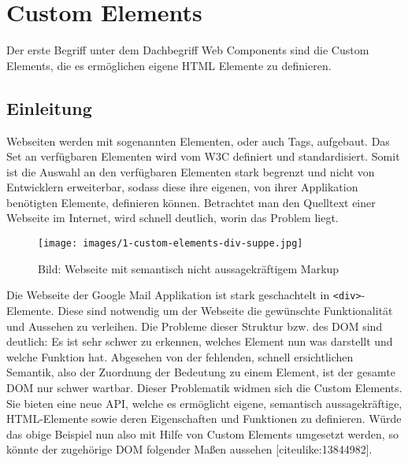 \section{Custom Elements}\label{custom-elements}

Der erste Begriff unter dem Dachbegriff Web Components sind die Custom
Elements, die es ermöglichen eigene HTML Elemente zu definieren.

\subsection{Einleitung}\label{einleitung}

Webseiten werden mit sogenannten Elementen, oder auch Tags, aufgebaut.
Das Set an verfügbaren Elementen wird vom W3C definiert und
standardisiert. Somit ist die Auswahl an den verfügbaren Elementen stark
begrenzt und nicht von Entwicklern erweiterbar, sodass diese ihre
eigenen, von ihrer Applikation benötigten Elemente, definieren können.
Betrachtet man den Quelltext einer Webseite im Internet, wird schnell
deutlich, worin das Problem liegt.

\begin{figure}[htbp]
\centering
\texttt{[image: images/1-custom-elements-div-suppe.jpg]}
\caption{Bild: Webseite mit semantisch nicht aussagekräftigem Markup}
\end{figure}

Die Webseite der Google Mail Applikation ist stark geschachtelt in
\texttt{\textless{}div\textgreater{}}-Elemente. Diese sind notwendig um
der Webseite die gewünschte Funktionalität und Aussehen zu verleihen.
Die Probleme dieser Struktur bzw. des DOM sind deutlich: Es ist sehr
schwer zu erkennen, welches Element nun was darstellt und welche
Funktion hat. Abgesehen von der fehlenden, schnell ersichtlichen
Semantik, also der Zuordnung der Bedeutung zu einem Element, ist der
gesamte DOM nur schwer wartbar. Dieser Problematik widmen sich die
Custom Elements. Sie bieten eine neue API, welche es ermöglicht eigene,
semantisch aussagekräftige, HTML-Elemente sowie deren Eigenschaften und
Funktionen zu definieren. Würde das obige Beispiel nun also mit Hilfe
von Custom Elements umgesetzt werden, so könnte der zugehörige DOM
folgender Maßen aussehen {[}citeulike:13844982{]}.


